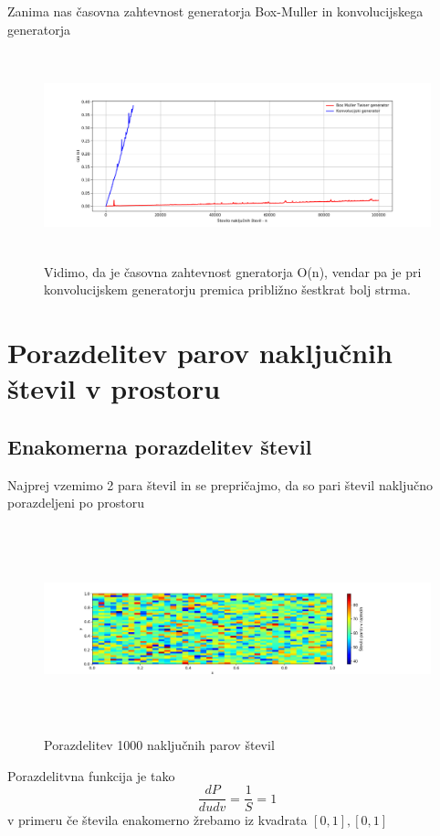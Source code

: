 \documentclass[11pt, a4paper]{article}
\begin{document}
Zanima nas časovna zahtevnost generatorja Box-Muller in konvolucijskega generatorja
\begin{figure}[H]
\hspace*{-2.5cm}  
  \includegraphics[width=22cm, height =6cm]{normalna_3.png}
 \caption{Vidimo, da je časovna zahtevnost gneratorja O(n), vendar pa je pri konvolucijskem generatorju premica približno šestkrat bolj strma. }
\end{figure}
\section{Porazdelitev parov naključnih števil v prostoru}
\subsection{Enakomerna porazdelitev števil}
Najprej vzemimo 2 para števil in se prepričajmo, da so pari števil naključno porazdeljeni po prostoru
\begin{figure}[H]
\hspace*{-2.5cm}  
  \includegraphics[width=21cm,height=6cm]{druga_1_enakomerno.png}
 \caption{Porazdelitev 1000 naključnih parov števil}
\end{figure}
Porazdelitvna funkcija je tako
\begin{equation}
\frac{dP}{du dv} = \frac{1}{S} = 1
\end{equation} 
v primeru če števila enakomerno žrebamo iz kvadrata $[0,1],[0,1]$
\end{document}
